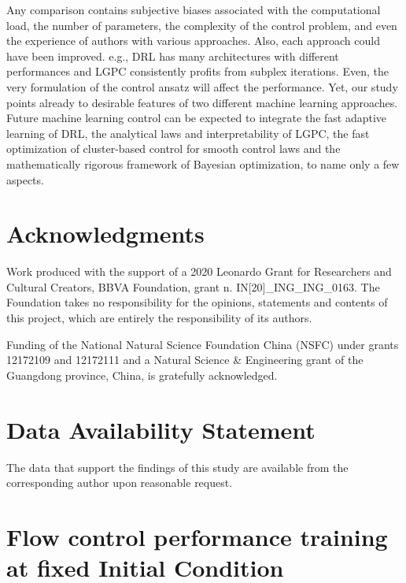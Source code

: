 Any comparison contains subjective biases associated with the computational load, the number of parameters, the complexity of the control problem, and even the experience of authors with various approaches. Also, each approach could have been improved. e.g., DRL has many architectures with different performances and LGPC consistently profits from subplex iterations\citep{cornejo2021gMLC}. Even, the very formulation of the control ansatz will affect the performance. Yet, our study points already to desirable features of two different machine learning approaches. Future machine learning control can be expected to integrate the fast adaptive learning of DRL, the analytical laws and interpretability of LGPC, the fast optimization of cluster-based control for smooth control laws\citep{Nair2019jfm} and the mathematically rigorous framework of Bayesian optimization\citep{Blanchard2022ams}, to name only a few aspects.

\section*{Acknowledgments}
Work produced with the support of a 2020 Leonardo Grant for Researchers and Cultural Creators, BBVA Foundation, grant n. IN[20]\_ING\_ING\_0163. The Foundation takes no responsibility for the opinions, statements and contents of this project, which are entirely the responsibility of its authors.

Funding of the National Natural Science Foundation China (NSFC) under grants 12172109 and 12172111 and a Natural Science \& Engineering grant of the Guangdong province, China, is gratefully acknowledged. 

\section*{Data Availability Statement}
The data that support the findings of this study are available from the corresponding author upon reasonable request.
\appendix
\section{Flow control performance training at fixed Initial Condition}
\label{ss:fixedIC}

